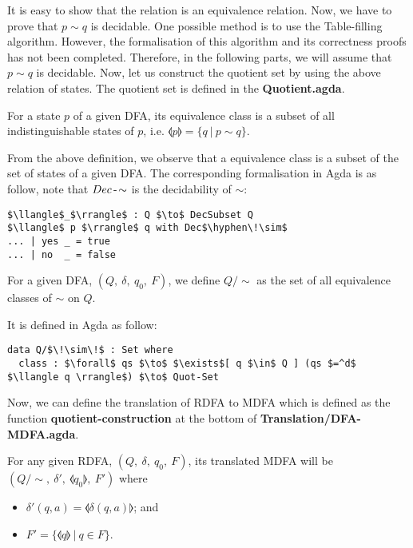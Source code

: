 \par It is easy to show that the relation is an equivalence
relation. Now, we have to prove that \(p \sim q\) is decidable. One
possible method is to use the Table-filling algorithm. However, the
formalisation of this algorithm and its correctness proofs has not
been completed. Therefore, in the following parts, we will assume that
\(p \sim q\) is decidable. Now, let us construct the quotient set by using the above
relation of states. The quotient set is defined in the
\textbf{Quotient.agda}. 

\begin{defn}
\noindent For a state \(p\) of a given DFA, its equivalence
class is a subset of all indistinguishable states of \(p\), i.e. \(\llangle p
\rrangle = \{q\ |\ p \sim q\}\). 
\end{defn}

\par From the above definition, we observe that a equivalence class
is a subset of the set of states of a given DFA. The corresponding formalisation in
Agda is as follow, note that \(Dec\operatorname{-}\!\sim\) is the decidability of
\(\sim\):
\begin{lstlisting}[mathescape=true,xleftmargin=.2\textwidth]
$\llangle$_$\rrangle$ : Q $\to$ DecSubset Q
$\llangle$ p $\rrangle$ q with Dec$\hyphen\!\sim$
... | yes _ = true
... | no  _ = false
\end{lstlisting}

\begin{defn}
\noindent For a given DFA, \((Q,\ \delta,\ q_0,\ F)\), we define
\(Q/\!\sim\) as the set of all equivalence classes of
\(\sim\) on \(Q\). 
\end{defn}

\par It is defined in Agda as follow: 
\begin{lstlisting}[mathescape=true,xleftmargin=.2\textwidth]
data Q/$\!\sim\!$ : Set where
  class : $\forall$ qs $\to$ $\exists$[ q $\in$ Q ] (qs $=^d$ $\llangle q \rrangle$) $\to$ Quot-Set
\end{lstlisting}

\par Now, we can define the translation of RDFA to MDFA which is
defined as the function \textbf{quotient-construction} at the bottom of \textbf{Translation/DFA-MDFA.agda}. 
\begin{defn}
\label{defn:quotient}
\noindent For any given RDFA, \((Q,\ \delta,\ q_0,\ F)\), its
translated MDFA will be \((Q/\!\sim,\ \delta',\ \llangle q_0 \rrangle,\ F')\) where
\begin{itemize}[nolistsep]
\item \(\delta'(q,a) = \llangle \delta(q,a) \rrangle\); and
\item \(F' = \{\llangle q \rrangle\ |\ q \in F\}\).
\end{itemize}
\end{defn}

